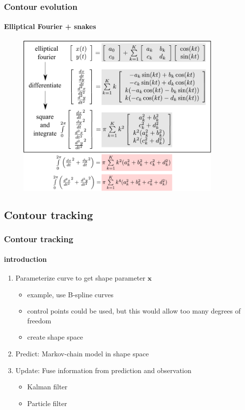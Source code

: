 \begin{frame}
\frametitle{Contour evolution}
\framesubtitle{Elliptical Fourier + snakes}
\logoCSIPCPL\mypagenum
	\begin{figure}
		\includegraphics[width=0.9\textwidth]{figs/theory_curves_ellipticalFourierSnakes.pdf}
	\end{figure}
\end{frame}


\subsection{Contour tracking}
\begin{frame}
\frametitle{Contour tracking}
\framesubtitle{introduction}
\logoCSIPCPL\mypagenum
	\begin{enumerate}
		\item Parameterize curve to get shape parameter $\mathbf{x}$
			\begin{itemize}
				\item example, use B-spline curves
				\item control points could be used, but this would allow too many degrees of freedom
				\item create shape space
			\end{itemize}
		\item Predict: Markov-chain model in shape space
		\item Update: Fuse information from prediction and observation
			\begin{itemize}
				\item Kalman filter
				\item Particle filter
			\end{itemize}
	\end{enumerate}
\end{frame}

